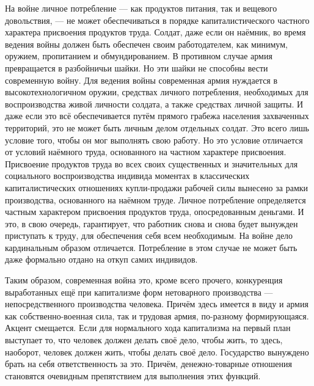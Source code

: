 \documentclass[../main]{subfiles}
\begin{document}
На войне личное потребление — как продуктов питания, так и вещевого довольствия, — не может обеспечиваться в порядке капиталистического частного характера присвоения продуктов труда. Солдат, даже если он наёмник, во время ведения войны должен быть обеспечен своим работодателем, как минимум, оружием, пропитанием и обмундированием. В противном случае армия превращается в разбойничьи шайки. Но эти шайки не способны вести современную войну. Для ведения войны современная армия нуждается в высокотехнологичном оружии, средствах личного потребления, необходимых для воспроизводства живой личности солдата, а также средствах личной защиты. И даже если это всё обеспечивается путём прямого грабежа населения захваченных территорий, это не может быть личным делом отдельных солдат. Это всего лишь условие того, чтобы он мог выполнять свою работу. Но это условие отличается от условий наёмного труда, основанного на частном характере присвоения. Присвоение продуктов труда во всех своих существенных и значительных для социального воспроизводства индивида моментах в классических капиталистических отношениях купли-продажи рабочей силы вынесено за рамки производства, основанного на наёмном труде. Личное потребление определяется частным характером присвоения продуктов труда, опосредованным деньгами. И это, в свою очередь, гарантирует, что работник снова и снова будет вынужден приступать к труду, для обеспечения себя всем необходимым. На войне дело кардинальным образом отличается. Потребление в этом случае не может быть даже формально отдано на откуп самих индивидов.

Таким образом, современная война это, кроме всего прочего, конкуренция выработанных ещё при капитализме форм нетоварного производства — непосредственного производства человека. Причём здесь имеется в виду и армия как собственно-военная сила, так и трудовая армия, по-разному формирующаяся. Акцент смещается. Если для нормального хода капитализма на первый план выступает то, что человек должен делать своё дело, чтобы жить, то здесь, наоборот, человек должен жить, чтобы делать своё дело. Государство вынуждено брать на себя ответственность за это. Причём, денежно-товарные отношения становятся очевидным препятствием для выполнения этих функций.
\end{document}
